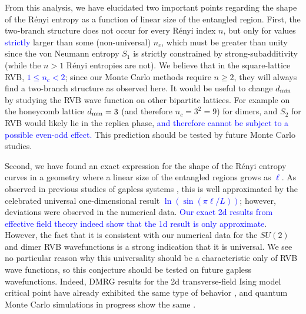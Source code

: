 \documentclass[11pt]{iopart}
\begin{document}
From this analysis, we have elucidated two important points regarding the shape of the R\'enyi entropy as a function of linear size of the entangled region.  
First, the two-branch structure does not occur for every R\'enyi index $n$, but only for values \textcolor{blue}{strictly} larger than some (non-universal) $n_c$, which must be greater than unity since the von Neumann entropy $S_1$ is strictly constrained by strong-subadditivity (while the $n>1$ R\'enyi entropies are not).  We believe that in the square-lattice RVB, \textcolor{blue}{$1\leq n_c<2$}; since our Monte Carlo methods require $n\ge 2$, they will always find a two-branch structure as observed here.  
It would be useful to change $d_{\rm min}$ by studying the RVB wave function on other bipartite lattices. For example on the honeycomb lattice $d_{\rm min}=3$ (and therefore $n_c=3^2=9$) for dimers, and $S_2$ for RVB would likely lie in the replica phase, \textcolor{blue}{and therefore cannot be subject to a possible even-odd effect.} 
This prediction should be tested by future Monte Carlo studies.

Second, we have found an exact expression for the shape of the R\'enyi entropy curves in a geometry where a linear size of the entangled regions grows as \textcolor{blue}{$\ell$}.  As observed in previous studies of gapless systems \cite{Ju2012}, this is well approximated by the celebrated universal one-dimensional result \textcolor{blue}{$\ln(\sin(\pi \ell /L))$}; however, deviations were observed in the numerical data.  \textcolor{blue}{Our exact 2d results from effective field theory indeed show that the 1d result is only approximate}. However, the fact that it is consistent with our numerical data for the $SU(2)$ and dimer RVB wavefunctions is a strong indication that  it is universal. We see no particular reason why this universality should be a characteristic only of RVB wave functions, so this conjecture should be tested on future gapless wavefunctions.  Indeed, DMRG results for the 2d transverse-field Ising model critical point have already exhibited the same type of behavior \cite{Konik}, and quantum 
Monte Carlo simulations in progress show the same \cite{RogTFIM}.
\end{document}

